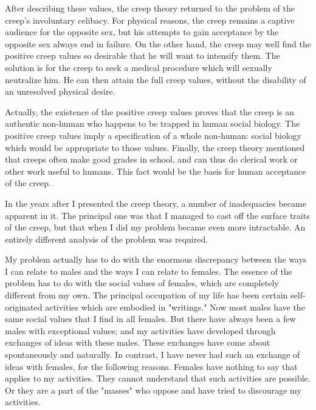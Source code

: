 \documentclass[10pt,twoside,draft]{memoir}
\begin{document}
{{{After describing these values, the creep theory returned to the problem 
of the creep's involuntary celibacy. For physical reasons, the creep remains a 
captive audience for the opposite sex, but his attempts to gain acceptance by 
the opposite sex always end in failure. On the other hand, the creep may 
well find the positive creep values so desirable that he will want to intensify 
them. The solution is for the creep to seek a medical procedure which will 
sexually neutralize him. He can then attain the full creep values, without the 
disability of an unresolved physical desire. 

Actually, the existence of the positive creep values proves that the 
creep is an authentic non-human who happens to be trapped in human social 
biology. The positive creep values imply a specification of a whole 
non-human: social biology which would be appropriate to those values. 
Finally, the creep theory mentioned that creeps often make good grades in 
school, and can thus do clerical work or other work useful to humans. This 
fact would be the basis for human acceptance of the creep. 

In the years after I presented the creep theory, a number of 
inadequacies became apparent in it. The principal one was that I managed to 
cast off the surface traits of the creep, but that when I did my problem 
became even more intractable. An entirely different analysis of the problem 
was required. 

My problem actually has to do with the enormous discrepancy between 
the ways I can relate to males and the ways I can relate to females. The 
essence of the problem has to do with the social values of females, which are 
completely different from my own. The principal occupation of my life has 
been certain self-originated activities which are embodied in "writings." Now 
most males have the same social values that I find in all females. But there 
have always been a few males with exceptional values; and my activities have 
developed through exchanges of ideas with these males. These exchanges 
have come about spontaneously and naturally. In contrast, I have never had 
such an exchange of ideas with females, for the following reasons. Females 
have nothing to say that applies to my activities. They cannot understand 
that such activities are possible. Or they are a part of the "masses" who 
oppose and have tried to discourage my activities. 

}}}
\end{document}
